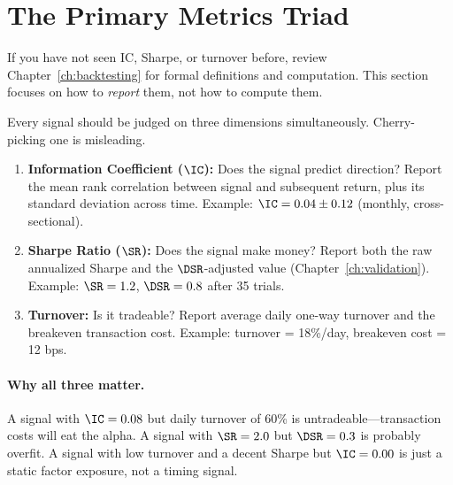 \section{The Primary Metrics Triad}
\label{sec:presenting:triad}

\begin{prereq}
If you have not seen IC, Sharpe, or turnover before, review
Chapter~\ref{ch:backtesting} for formal definitions and computation.  This
section focuses on how to \emph{report} them, not how to compute them.
\end{prereq}

Every signal should be judged on three dimensions simultaneously.
Cherry-picking one is misleading.

\begin{definition}
\begin{enumerate}[leftmargin=1.5em]
  \item \textbf{Information Coefficient ($\IC$):} Does the signal predict
    direction?  Report the mean rank correlation between signal and
    subsequent return, plus its standard deviation across time.
    Example: $\IC = 0.04 \pm 0.12$ (monthly, cross-sectional).
  \item \textbf{Sharpe Ratio ($\SR$):} Does the signal make money?
    Report both the raw annualized Sharpe and the $\DSR$-adjusted value
    (Chapter~\ref{ch:validation}).
    Example: $\SR = 1.2$, $\DSR = 0.8$ after 35 trials.
  \item \textbf{Turnover:} Is it tradeable?  Report average daily
    one-way turnover and the breakeven transaction cost.
    Example: turnover = 18\%/day, breakeven cost = 12 bps.
\end{enumerate}
\end{definition}

\paragraph{Why all three matter.}  A signal with $\IC = 0.08$ but
daily turnover of 60\% is untradeable---transaction costs will eat the
alpha.  A signal with $\SR = 2.0$ but $\DSR = 0.3$ is probably overfit.
A signal with low turnover and a decent Sharpe but $\IC = 0.00$ is
just a static factor exposure, not a timing signal.


